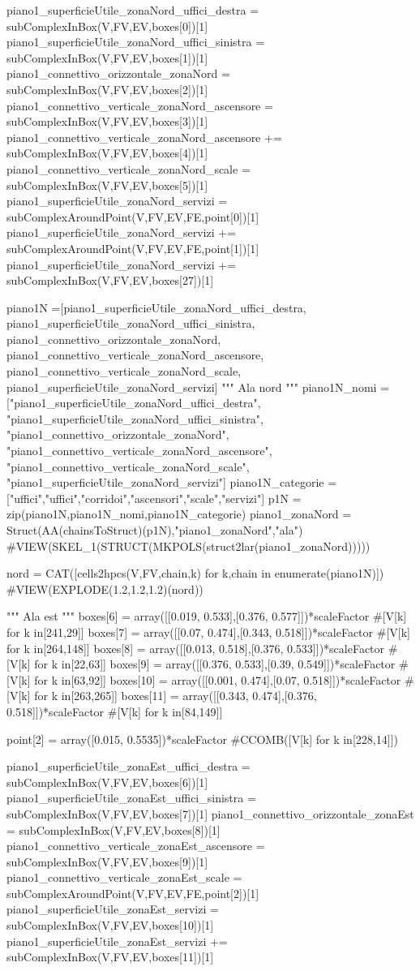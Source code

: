 piano1_superficieUtile_zonaNord_uffici_destra = subComplexInBox(V,FV,EV,boxes[0])[1]
piano1_superficieUtile_zonaNord_uffici_sinistra = subComplexInBox(V,FV,EV,boxes[1])[1]
piano1_connettivo_orizzontale_zonaNord = subComplexInBox(V,FV,EV,boxes[2])[1]
piano1_connettivo_verticale_zonaNord_ascensore = subComplexInBox(V,FV,EV,boxes[3])[1]
piano1_connettivo_verticale_zonaNord_ascensore += subComplexInBox(V,FV,EV,boxes[4])[1]
piano1_connettivo_verticale_zonaNord_scale = subComplexInBox(V,FV,EV,boxes[5])[1]
piano1_superficieUtile_zonaNord_servizi = subComplexAroundPoint(V,FV,EV,FE,point[0])[1]
piano1_superficieUtile_zonaNord_servizi += subComplexAroundPoint(V,FV,EV,FE,point[1])[1]
piano1_superficieUtile_zonaNord_servizi += subComplexInBox(V,FV,EV,boxes[27])[1]

piano1N =[piano1_superficieUtile_zonaNord_uffici_destra, piano1_superficieUtile_zonaNord_uffici_sinistra, piano1_connettivo_orizzontale_zonaNord, piano1_connettivo_verticale_zonaNord_ascensore, piano1_connettivo_verticale_zonaNord_scale, piano1_superficieUtile_zonaNord_servizi]
""" Ala nord """
piano1N_nomi =["piano1_superficieUtile_zonaNord_uffici_destra", "piano1_superficieUtile_zonaNord_uffici_sinistra", "piano1_connettivo_orizzontale_zonaNord", "piano1_connettivo_verticale_zonaNord_ascensore", "piano1_connettivo_verticale_zonaNord_scale", "piano1_superficieUtile_zonaNord_servizi"]
piano1N_categorie =["uffici","uffici","corridoi","ascensori","scale","servizi"]
p1N = zip(piano1N,piano1N_nomi,piano1N_categorie)
piano1_zonaNord = Struct(AA(chainsToStruct)(p1N),"piano1_zonaNord","ala")
#VIEW(SKEL_1(STRUCT(MKPOLS(struct2lar(piano1_zonaNord)))))
    
nord = CAT([cells2hpcs(V,FV,chain,k) for k,chain in enumerate(piano1N)])
#VIEW(EXPLODE(1.2,1.2,1.2)(nord))

""" Ala est """
boxes[6] = array([[0.019, 0.533],[0.376, 0.577]])*scaleFactor #[V[k] for k in[241,29]]
boxes[7] = array([[0.07, 0.474],[0.343, 0.518]])*scaleFactor #[V[k] for k in[264,148]]
boxes[8] = array([[0.013, 0.518],[0.376, 0.533]])*scaleFactor #[V[k] for k in[22,63]]
boxes[9] = array([[0.376, 0.533],[0.39, 0.549]])*scaleFactor #[V[k] for k in[63,92]]
boxes[10] = array([[0.001, 0.474],[0.07, 0.518]])*scaleFactor #[V[k] for k in[263,265]]
boxes[11] = array([[0.343, 0.474],[0.376, 0.518]])*scaleFactor #[V[k] for k in[84,149]]

point[2] = array([0.015, 0.5535])*scaleFactor #CCOMB([V[k] for k in[228,14]])

piano1_superficieUtile_zonaEst_uffici_destra = subComplexInBox(V,FV,EV,boxes[6])[1]
piano1_superficieUtile_zonaEst_uffici_sinistra = subComplexInBox(V,FV,EV,boxes[7])[1]
piano1_connettivo_orizzontale_zonaEst = subComplexInBox(V,FV,EV,boxes[8])[1]
piano1_connettivo_verticale_zonaEst_ascensore = subComplexInBox(V,FV,EV,boxes[9])[1]
piano1_connettivo_verticale_zonaEst_scale = subComplexAroundPoint(V,FV,EV,FE,point[2])[1]
piano1_superficieUtile_zonaEst_servizi = subComplexInBox(V,FV,EV,boxes[10])[1]
piano1_superficieUtile_zonaEst_servizi += subComplexInBox(V,FV,EV,boxes[11])[1]

